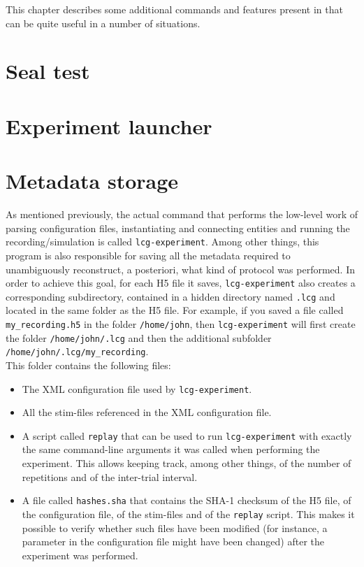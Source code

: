 This chapter describes some additional commands and features present
in \progname that can be quite useful in a number of situations.

\section{Seal test}

\section{Experiment launcher}

\section{Metadata storage} \label{sec:metadata}
As mentioned previously, the actual command that performs the
low-level work of parsing configuration files, instantiating and
connecting entities and running the recording/simulation is called
\verb+lcg-experiment+. Among other things, this program is also
responsible for saving all the metadata required to
unambiguously reconstruct, a posteriori, what kind of protocol was
performed. In order to achieve this goal, for each H5 file it saves,
\verb+lcg-experiment+ also creates a corresponding subdirectory,
contained in a hidden directory named \verb+.lcg+ and located in the
same folder as the H5 file. For example, if you saved a file called
\verb+my_recording.h5+ in the folder
\verb+/home/john+, then \verb+lcg-experiment+ will
first create the folder \verb+/home/john/.lcg+ and
then the additional subfolder
\verb+/home/john/.lcg/my_recording+. \\
This folder contains the following files:
\begin{itemize}
\item The XML configuration file used by \verb+lcg-experiment+.
\item All the stim-files referenced in the XML configuration file.
\item A script called \verb+replay+ that can be used to run
  \verb+lcg-experiment+ with exactly the same command-line arguments
  it was called when performing the experiment. This allows keeping
  track, among other things, of the number of repetitions and of the
  inter-trial interval.
\item A file called \verb+hashes.sha+ that contains the SHA-1 checksum
  of the H5 file, of the configuration file, of the stim-files and of
  the \verb+replay+ script. This makes it possible to verify whether
  such files have been modified (for instance, a parameter in the
  configuration file might have been changed) after the experiment was
  performed.
\end{itemize}
